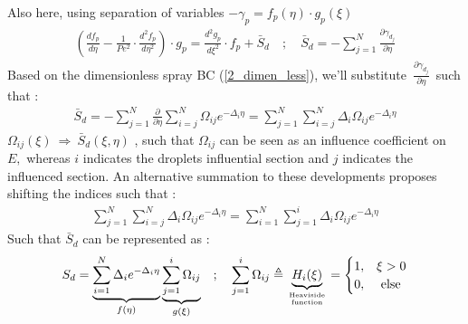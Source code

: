 \documentclass[12pt]{article}
\numberwithin{equation}{section}
\begin{document}
\begin{flushleft}
Also here, using separation of variables $-\gamma_{p}=f_{p}(\eta) \cdot g_{p}(\xi)$
\begin{align} 
\left(\frac{d f_{p}}{d \eta}-\frac{1}{P e^{2}} \cdot \frac{d^{2} f_{p}}{d \eta^{2}}\right) \cdot g_{p}=\frac{d^{2} g_{p}}{d \xi^{2}} \cdot f_{p}+\bar{S}_{d} \quad ; \quad \bar{S}_{d}=-\sum_{j=1}^{N} \frac{\partial \gamma_{d_{j}}}{\partial \eta} \label{3_seperation}
\end{align}
Based on the dimensionless spray BC (\ref{2_dimen_less}), we'll substitute \,{\Large $\frac{\partial \gamma_{d_j}}{\partial \eta}$}\, such that :
\begin{align} 
\bar{S}_{d}=-\sum_{j=1}^{N} \frac{\partial}{\partial \eta} \sum_{i=j}^{N} \Omega_{i j} e^{-\Delta_{i} \eta}=\sum_{j=1}^{N} \sum_{i=j}^{N} \Delta_{i} \Omega_{i j} e^{-\Delta_{i} \eta}
\end{align} 
$\Omega_{i j}(\xi) \ \Rightarrow \ \bar{S}_{d}(\xi, \eta)$ , such that $\Omega_{i j}$ can be seen as an influence coefficient on $E,$ whereas $i$ indicates the droplets influential section and $j$ indicates the influenced section. An alternative summation to these developments proposes shifting the indices such that :
\begin{align} 
\sum_{j=1}^{N} \sum_{i=j}^{N} \Delta_{i} \Omega_{i j} e^{-\Delta_{i} \eta}=\sum_{i=1}^{N} \sum_{j=1}^{i} \Delta_{i} \Omega_{i j} e^{-\Delta_{i} \eta}
\end{align} 
Such that $\bar{S}_{d}$ can be represented as :
\begin{align} 
S_{d}=\underbrace{\sum_{i=1}^{N} \Delta_{i} e^{-\Delta_{i} \eta}}_{f(\eta)} \underbrace{\sum_{j=1}^{i} \Omega_{i j}}_{g(\xi)} \quad ; \quad \sum_{j=1}^{i} \Omega_{i j} \triangleq \underbrace{H_{i}(\xi)}_{ \text {Heaviside} \atop \text { function }}= \begin{cases} 
1, & \xi>0 \\
0, & \text { else }
\end{cases} \label{3_heaviside}
\end{align} 


\end{flushleft}
\end{document}
